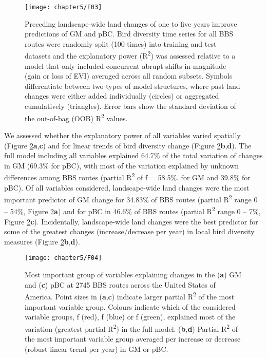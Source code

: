 \begin{figure}[htb]
\centering
\texttt{[image: chapter5/F03]}
\caption{Preceding landscape-wide land changes of one to five years improve predictions of GM and pBC. Bird diversity time series for all BBS routes were randomly split (100 times) into training and test datasets and the explanatory power (R\textsuperscript{2}) was assessed relative to a model that only included concurrent abrupt shifts in magnitude (gain or loss of EVI) averaged across all random subsets. Symbols differentiate between two types of model structures, where past land changes were either added individually (circles) or aggregated cumulatively (triangles). Error bars show the standard deviation of the out-of-bag (OOB) R\textsuperscript{2} values. }
\label{F05_03}
\end{figure}

We assessed whether the explanatory power of all variables varied spatially (Figure \ref{F05_04}\textbf{a},\textbf{c}) and for linear trends of bird diversity change (Figure \ref{F05_04}\textbf{b},\textbf{d}). The full model including all variables explained 64.7\% of the total variation of changes in GM (69.3\% for pBC), with most of the variation explained by unknown differences among BBS routes (partial R\textsuperscript{2} of f = 58.5\%. for GM and 39.8\% for pBC). Of all variables considered, landscape-wide land changes were the most important predictor of GM change for 34.83\% of BBS routes (partial R\textsuperscript{2} range 0 – 54\%, Figure \ref{F05_04}\textbf{a}) and for pBC in 46.6\% of BBS routes (partial R\textsuperscript{2} range 0 – 7\%, Figure \ref{F05_04}\textbf{c}). Incidentally, landscape-wide land changes were the best predictor for some of the greatest changes (increase/decrease per year) in local bird diversity measures (Figure \ref{F05_04}\textbf{b},\textbf{d}).

\begin{figure}[htb]
\centering
\texttt{[image: chapter5/F04]}
\caption{Most important group of variables explaining changes in the (\textbf{a}) GM and (\textbf{c}) pBC at 2745 BBS routes across the United States of America. Point sizes in (\textbf{a},\textbf{c}) indicate larger partial R\textsuperscript{2} of the most important variable group. Colours indicate which of the considered variable groups, f (red), f (blue) or f (green), explained most of the variation (greatest partial R\textsuperscript{2}) in the full model. (\textbf{b},\textbf{d}) Partial R\textsuperscript{2} of the most important variable group averaged per increase or decrease (robust linear trend per year) in GM or pBC.  }
\label{F05_04}
\end{figure}

